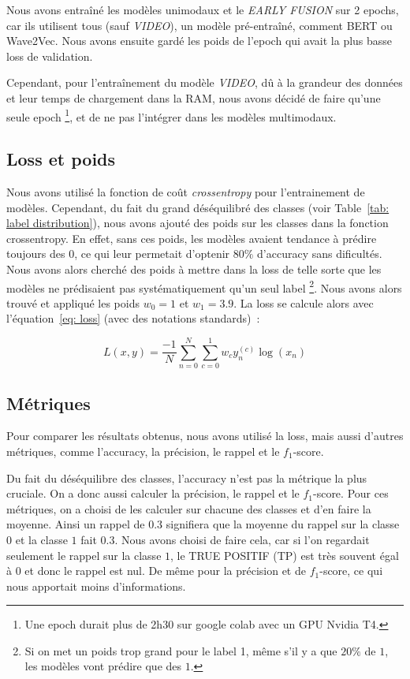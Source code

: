Nous avons entraîné les modèles unimodaux et le \textit{EARLY FUSION} sur 2 epochs, car ils utilisent tous (sauf \textit{VIDEO}), 
un modèle pré-entraîné, comment BERT ou Wave2Vec. Nous avons ensuite gardé les poids de 
l'epoch qui avait la plus basse loss de validation.

Cependant, pour l'entraînement du modèle \textit{VIDEO}, dû à la grandeur des données et 
leur temps de chargement dans la RAM, nous avons décidé de faire qu'une seule epoch
\footnote{Une epoch durait plus de 2h30 sur google colab avec un GPU Nvidia T4.}, et de ne pas l'intégrer dans les modèles multimodaux.

\subsection{Loss et poids}
Nous avons utilisé la fonction de coût \textit{crossentropy} pour l'entrainement de modèles. 
Cependant, du fait du grand déséquilibré des classes (voir Table~\ref{tab: label distribution}), nous avons ajouté des poids 
sur les classes dans la fonction crossentropy. En effet, sans ces poids, les modèles avaient tendance à prédire toujours des $0$, ce 
qui leur permetait d'optenir $80\%$ d'accuracy sans dificultés. Nous avons alors cherché des poids à mettre dans la loss de telle sorte 
que les modèles ne prédisaient pas systématiquement qu'un seul label
\footnote{Si on met un poids trop grand pour le label 1, même s'il y a que $20\%$ de $1$, les modèles vont prédire que des $1$.}.
Nous avons alors trouvé et appliqué les poids $w_0 = 1$ et $w_1=3.9$. La loss se calcule alors avec l'équation~\ref{eq: loss}
(avec des notations standards)~:

\begin{equation}
    L(x, y) = \frac{-1}{N} \sum_{n=0}^{N} \sum_{c=0}^{1} w_c y_n^{(c)} \log(x_n)
    \label{eq: loss}
\end{equation}

\subsection{Métriques}
Pour comparer les résultats obtenus, nous avons utilisé la loss, mais aussi d'autres métriques,
comme l'accuracy, la précision, le rappel et le $f_1$-score.

Du fait du déséquilibre des classes, l'accuracy n'est pas la métrique la plus cruciale. On a donc aussi calculer la précision, le rappel et le $f_1$-score. Pour ces métriques, on a choisi de les calculer 
sur chacune des classes et d'en faire la moyenne. Ainsi un rappel de $0.3$ signifiera que la moyenne du rappel sur
la classe $0$ et la classe $1$ fait $0.3$. Nous avons choisi de faire cela, car si l'on regardait seulement 
le rappel sur la classe $1$, le TRUE POSITIF (TP) est très souvent égal à $0$ et donc le rappel est nul. De même 
pour la précision et de $f_1$-score, ce qui nous apportait moins d'informations.